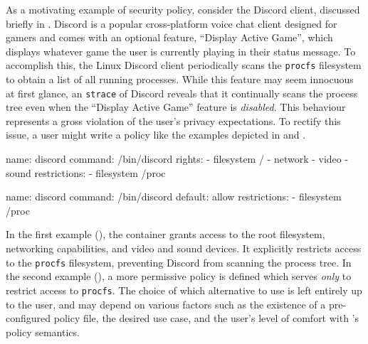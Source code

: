  As a motivating example of \bpfcontain{} security policy, consider the Discord
client, discussed briefly in . Discord is a popular
cross-platform voice chat client designed for gamers and comes with an optional
feature, \enquote{Display Active Game}, which displays whatever game the user is
currently playing in their status message. To accomplish this, the Linux Discord
client periodically scans the \texttt{procfs} filesystem to obtain a list of all
running processes.  While this feature may seem innocuous at first glance, an
\texttt{strace} \cite{strace} of Discord reveals that it continually scans the
process tree even when the \enquote{Display Active Game} feature is
\textit{disabled}. This behaviour represents a gross violation of the user's
privacy expectations. To rectify this issue, a user might write a \bpfcontain{}
policy like the examples depicted in  and
.

\begin{listing}[
  language=yaml,
  caption={
    A sample manifest for Discord \cite{discord} using \bpfcontain{}'s more
    restrictive default-deny confinement. All accesses which are not listed
    under the container's rights are implictly denied. The explicit restriction
    on access to \texttt{procfs} prevents Discord from scanning the process
    tree, regardless of its rights.
  },
  label={lst:discord_a},
  gobble=2]
  name: discord
  command: /bin/discord
  rights:
    - filesystem /
    - network
    - video
    - sound
  restrictions:
    - filesystem /proc
\end{listing}

\begin{listing}[
  language=yaml,
  caption={
    A sample manifest for Discord \cite{discord} using \bpfcontain{}'s optional
    default-allow confinement.  This permits a much simpler policy that directly
    targets Discord's \texttt{procfs} scanning behaviour.
  },
  label={lst:discord_b},
  gobble=2]
  name: discord
  command: /bin/discord
  default: allow
  restrictions:
    - filesystem /proc
\end{listing}

In the first example (), the container grants access to the
root filesystem, networking capabilities, and video and sound devices. It
explicitly restricts access to the \texttt{procfs} filesystem, preventing
Discord from scanning the process tree. In the second example
(), a more permissive policy is defined which serves
\textit{only} to restrict access to \texttt{procfs}. The choice of which
alternative to use is left entirely up to the user, and may depend on various
factors such as the existence of a pre-configured policy file, the desired use
case, and the user's level of comfort with \bpfcontain{}'s policy semantics.

